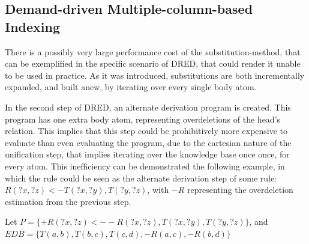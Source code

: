 \documentclass[sigconf,screen,review,natbib]{acmart}
\theoremstyle{definition}
\begin{document}
\subsection{Demand-driven Multiple-column-based Indexing}
There is a possibly very large performance cost of the substitution-method, that can be exemplified in the specific scenario
of DRED, that could render it unable to be used in practice. As it was introduced, substitutions are both incrementally expanded,
and built anew, by iterating over every single body atom.

In the second step of DRED, an alternate derivation program is created. This program has one extra body atom, representing
overdeletions of the head's relation. This implies that this step could be prohibitively more expensive to evaluate than even
evaluating the program, due to the cartesian nature of the unification step, that implies iterating over the knowledge base once
once, for every atom. This inefficiency can be demonstrated the following example, in which the rule could be seen as the
alternate derivation step of some rule: $R(?x, ?z) <- T(?x, ?y), T(?y, ?z)$, with $-R$ representing the overdeletion estimation
from the previous step.

Let $P = \{+R(?x, ?z) <- -R(?x, ?z), T(?x, ?y), T(?y, ?z)\}$, and $EDB = \{T(a, b), T(b, c), T(c, d), -R(a, c), -R(b, d)\}$
\end{document}
